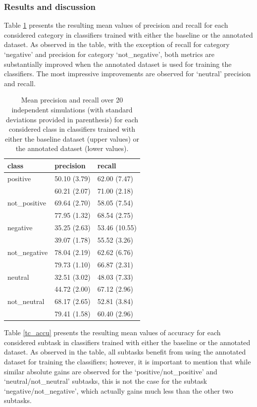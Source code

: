 \documentclass[11pt,letterpaper]{article}
\begin{document}
\subsubsection{Results and discussion}
Table \ref{tc_pre_rec} presents the resulting mean values of precision and recall for each considered category 
in classifiers trained with either the baseline or the annotated dataset. As observed in the table, with the
exception of recall for category `negative' and precision for category `not\_negative', both metrics are substantially 
improved when the annotated dataset is used for training the classifiers. The most impressive improvements
are observed for `neutral' precision and recall. 

\begin{table}
\begin{tabular}{|l|l|l|}
\hline
class &precision &recall \\ 
\hline
positive &50.10 (3.79) &62.00 (7.47) \\
&60.21 (2.07)  &71.00 (2.18) \\ 
\hline
not\_positive &69.64 (2.70) &58.05 (7.54) \\ 
&77.95 (1.32) &68.54 (2.75) \\ 
\hline
negative &35.25 (2.63) &53.46 (10.55) \\ 
&39.07 (1.78) &55.52 (3.26) \\ 
\hline
not\_negative &78.04 (2.19) &62.62 (6.76) \\ 
&79.73 (1.10) &66.87 (2.31) \\ 
\hline
neutral &32.51 (3.02) &48.03 (7.33) \\ 
&44.72 (2.00) &67.12 (2.96) \\ 
\hline
not\_neutral &68.17 (2.65) &52.81 (3.84) \\ 
&79.41 (1.58) &60.40 (2.96) \\ 
\hline
\end{tabular}
\caption{Mean precision and recall over 20 independent simulations (with standard deviations provided in parenthesis) 
for each considered class in classifiers trained with either the baseline dataset (upper values) or the annotated dataset (lower values).}
\label{tc_pre_rec}
\end{table}

Table \ref{tc_accu} presents the resulting mean values of accuracy for each considered subtask 
in classifiers trained with either the baseline or the annotated dataset. As observed in the table,
all subtasks benefit from using the annotated dataset for training the classifiers; however, it is 
important to mention that while similar absolute gains are observed for the `positive/not\_positive' 
and `neutral/not\_neutral' subtasks, this is not the case for the subtask `negative/not\_negative', 
which actually gains much less than the other two subtasks.
\end{document}
